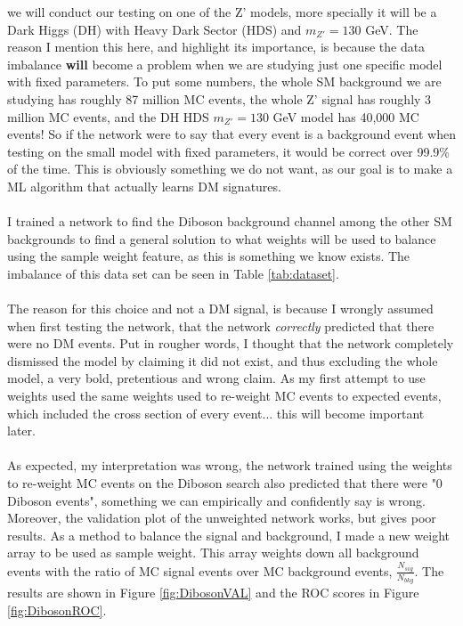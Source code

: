 \documentclass[14pt, a4paper]{book}
\begin{document}
we will conduct our testing on one of the Z' models, more specially it will be a Dark Higgs (DH) with Heavy Dark Sector (HDS) and $m_{Z'}=130$ GeV. The reason I mention this here, and highlight its importance, is because 
the data imbalance \textbf{will} become a problem when we are studying just one specific model with fixed parameters. To put some numbers, the whole SM background we are studying has roughly 87 million MC events, 
the whole Z' signal has roughly 3 million MC events, and the DH HDS $m_{Z'} = 130$ GeV model has 40,000 MC events! So if the network were to say that every event is a background event when testing on the small model with fixed parameters, 
it would be correct over 99.9\% of the time. This is obviously something we do not want, as our goal is to make a ML algorithm that actually learns DM signatures.\\
\\I trained a network to find the Diboson background channel among the other SM backgrounds to find a general solution to what weights will be used to balance using the sample weight feature, as this is something we know exists. 
The imbalance of this data set can be seen in Table \ref{tab:dataset}.\\
\\The reason for this choice and not a DM signal, is because I wrongly assumed when first testing the network, that the network \textit{correctly} predicted that there were no DM events. 
Put in rougher words, I thought that the network completely dismissed the model by claiming it did not exist, and thus excluding the whole model, a very bold, pretentious and wrong claim. 
As my first attempt to use weights used the same weights used to re-weight MC events to expected events, which included the cross section of every event... this will become important later.\\
\\As expected, my interpretation was wrong, the network trained using the weights to re-weight MC events on the Diboson search also predicted that there were "0 Diboson events", something we can empirically and confidently say is wrong. 
Moreover, the validation plot of the unweighted network works, but gives poor results. As a method to balance the signal and background, I made a new weight array to be used as sample weight. This array weights down all background events 
with the ratio of MC signal events over MC background events, $\frac{N_{sig}}{N_{bkg}}$. The results are shown in Figure \ref{fig:DibosonVAL} and the ROC scores in Figure \ref{fig:DibosonROC}.\\
\end{document}
